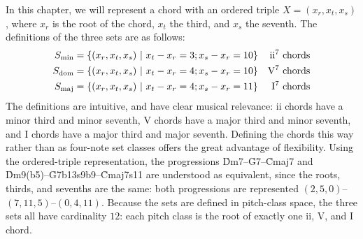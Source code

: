 In this chapter, we will represent a chord with an ordered triple $X = (x_r,
x_t, x_s)$, where $x_r$ is the root of the chord, $x_t$ the third, and $x_s$
the seventh. The definitions of the three sets are as follows:
{\novspace%
\begin{align*}
  \Smin &= \{ (x_r, x_t, x_s)\ |\ x_t - x_r = 3; x_s - x_r = 10 \} &
    \text{ii\tsup{7} chords} \\ %
  \Sdom &= \{ (x_r, x_t, x_s)\ |\ x_t - x_r = 4; x_s - x_r = 10 \} &
    \text{V\tsup{7} chords} \\ %
  \Smaj &= \{ (x_r, x_t, x_s)\ |\ x_t - x_r = 4; x_s - x_r = 11 \} &
    \text{I\tsup{7} chords}
\end{align*}}
%
The definitions are intuitive, and have clear musical relevance:
ii chords have a minor third and minor seventh, V chords have
a major third and minor seventh, and I chords have a major third and
major seventh. Defining the chords this way rather than as four-note set
classes offers the great advantage of flexibility. Using the ordered-triple
representation, the progressions \h{Dm7}--\h{G7}--\h{Cmaj7} and
\h{Dm9(b5)}--\h{G7b13s9b9}--\h{Cmaj7s11} are understood as equivalent, since
the roots, thirds, and sevenths are the same: both progressions are
represented $(2, 5, 0)$--\allowbreak$(7, 11, 5)$--\allowbreak$(0, 4,
11)$. Because the sets are defined in pitch-class space, the three sets all
have cardinality $12$: each pitch class is the root of exactly one ii,
V, and I chord.

